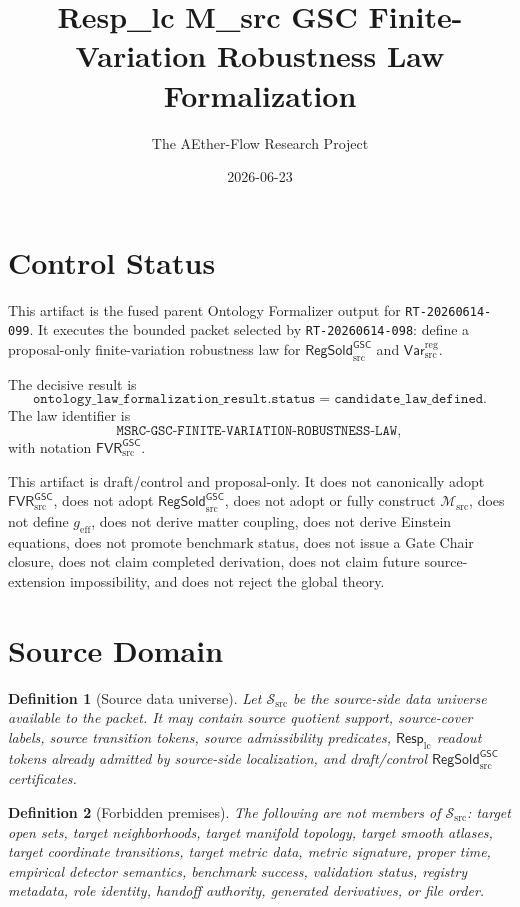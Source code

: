 \documentclass[11pt]{article}
\title{Resp\_lc M\_src GSC Finite-Variation Robustness Law Formalization}
\author{The AEther-Flow Research Project}
\date{2026-06-23}
\newcommand{\RespLC}{\mathsf{Resp}_{\mathrm{lc}}}
\newcommand{\Msrc}{\mathcal{M}_{\mathrm{src}}}
\newcommand{\geff}{g_{\mathrm{eff}}}
\newcommand{\RegSold}{\mathsf{RegSold}_{\mathrm{src}}^{\mathsf{GSC}}}
\newcommand{\FVR}{\mathsf{FVR}_{\mathrm{src}}^{\mathsf{GSC}}}
\newcommand{\VarRegSrc}{\mathsf{Var}^{\mathrm{reg}}_{\mathrm{src}}}
\newtheorem{definition}{Definition}
\begin{document}
\maketitle

\section*{Control Status}

This artifact is the fused parent Ontology Formalizer output for
\texttt{RT-20260614-099}. It executes the bounded packet selected by
\texttt{RT-20260614-098}: define a proposal-only finite-variation robustness
law for \(\RegSold\) and \(\VarRegSrc\).

The decisive result is
\[
  \texttt{ontology\_law\_formalization\_result.status}
  =
  \texttt{candidate\_law\_defined}.
\]
The law identifier is
\[
  \texttt{MSRC-GSC-FINITE-VARIATION-ROBUSTNESS-LAW},
\]
with notation \(\FVR\).

This artifact is draft/control and proposal-only. It does not canonically
adopt \(\FVR\), does not adopt \(\RegSold\), does not adopt or fully
construct \(\Msrc\), does not define \(\geff\), does not derive matter
coupling, does not derive Einstein equations, does not promote benchmark
status, does not issue a Gate Chair closure, does not claim completed
derivation, does not claim future source-extension impossibility, and does
not reject the global theory.

\section{Source Domain}

\begin{definition}[Source data universe]
Let \(\mathcal{S}_{\mathrm{src}}\) be the source-side data universe available
to the packet. It may contain source quotient support, source-cover labels,
source transition tokens, source admissibility predicates, \(\RespLC\) readout
tokens already admitted by source-side localization, and draft/control
\(\RegSold\) certificates.
\end{definition}

\begin{definition}[Forbidden premises]
The following are not members of \(\mathcal{S}_{\mathrm{src}}\): target open
sets, target neighborhoods, target manifold topology, target smooth atlases,
target coordinate transitions, target metric data, metric signature, proper
time, empirical detector semantics, benchmark success, validation status,
registry metadata, role identity, handoff authority, generated derivatives,
or file order.
\end{definition}
\end{document}
